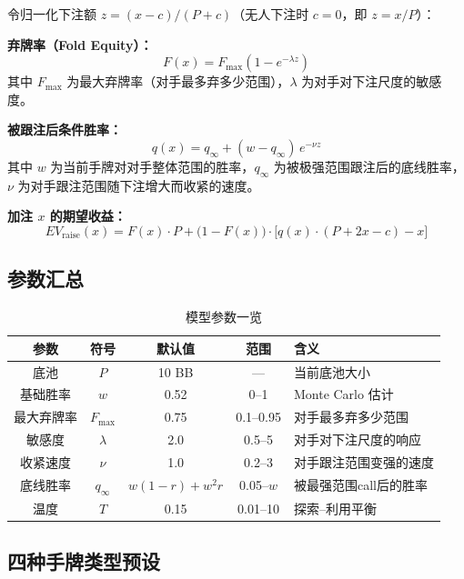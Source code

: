 \documentclass[12pt,a4paper]{ctexart}
\begin{document}
令归一化下注额 $z = (x-c)/(P+c)$（无人下注时 $c=0$，即 $z = x/P$）：

\textbf{弃牌率（Fold Equity）：}
\begin{equation}
F(x) = F_{\max}\left(1 - e^{-\lambda z}\right)
\label{eq:fold}
\end{equation}
其中 $F_{\max}$ 为最大弃牌率（对手最多弃多少范围），$\lambda$ 为对手对下注尺度的敏感度。

\textbf{被跟注后条件胜率：}
\begin{equation}
q(x) = q_{\infty} + (w - q_{\infty})\,e^{-\nu z}
\label{eq:condwin}
\end{equation}
其中 $w$ 为当前手牌对对手整体范围的胜率，$q_{\infty}$ 为被极强范围跟注后的底线胜率，
$\nu$ 为对手跟注范围随下注增大而收紧的速度。

\textbf{加注 $x$ 的期望收益：}
\begin{equation}
EV_{\text{raise}}(x) = F(x)\cdot P + \bigl(1-F(x)\bigr)\cdot\bigl[q(x)\cdot(P+2x-c)-x\bigr]
\label{eq:ev}
\end{equation}

\subsection{参数汇总}

\begin{table}[H]
\centering
\caption{模型参数一览}
\begin{tabular}{@{}ccccl@{}}
\toprule
\textbf{参数} & \textbf{符号} & \textbf{默认值} & \textbf{范围} & \textbf{含义} \\
\midrule
底池           & $P$    & 10 BB & —      & 当前底池大小 \\
基础胜率        & $w$    & 0.52  & 0--1   & Monte Carlo 估计 \\
最大弃牌率      & $F_{\max}$ & 0.75 & 0.1--0.95 & 对手最多弃多少范围 \\
敏感度          & $\lambda$ & 2.0 & 0.5--5 & 对手对下注尺度的响应 \\
收紧速度        & $\nu$  & 1.0  & 0.2--3 & 对手跟注范围变强的速度 \\
底线胜率        & $q_{\infty}$ & $w(1-r)+w^2 r$ & 0.05--$w$ & 被最强范围call后的胜率 \\
温度           & $T$    & 0.15 & 0.01--10 & 探索--利用平衡 \\
\bottomrule
\end{tabular}
\end{table}

\subsection{四种手牌类型预设}
\end{document}
